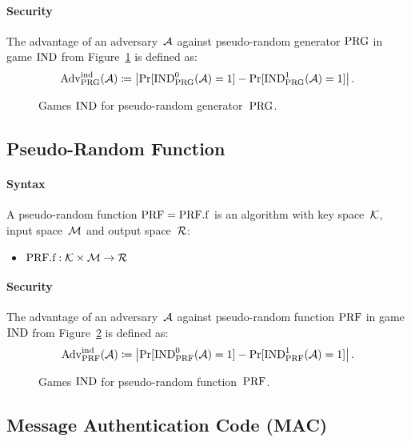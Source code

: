 \documentclass[a4paper,orivec]{llncs}
\begin{document}
\paragraph{Security}
The advantage of an adversary~$\mathcal{A}$ against pseudo-random generator $\mathrm{PRG}$ in game ${\mathrm{IND}}$ from Figure~\ref{fig:prg:ind} is defined as:
\[
\mathrm{Adv}_{\mathrm{PRG}}^{\mathrm{ind}}(\mathcal{A})\coloneqq\left|\Pr[{\mathrm{IND}}_{\mathrm{PRG}}^0(\mathcal{A})=1]-\Pr[{\mathrm{IND}}_{\mathrm{PRG}}^1(\mathcal{A})=1]\right|\text{.}
\]

\begin{figure}[!ht]
    \centering
    \nicoresetlinenr%
    \fbox{%
        \scalebox{\codescalefactor}{%
        }%
    }
    \caption{%
        Games ${\mathrm{IND}}$ for pseudo-random generator~$\mathrm{PRG}$.
    }
    \label{fig:prg:ind}
\end{figure}

\subsection{Pseudo-Random Function}

\paragraph{Syntax}
A pseudo-random function $\mathrm{PRF}=\mathrm{PRF}.\mathrm{f}$ is an algorithm with key space~$\mathcal{K}$, input space~$\mathcal{M}$ and output space~$\mathcal{R}$:

\begin{itemize}
    \item $\mathrm{PRF}.\mathrm{f}: \mathcal{K}\times\mathcal{M} \to \mathcal{R}$
\end{itemize}

\paragraph{Security}
The advantage of an adversary~$\mathcal{A}$ against pseudo-random function $\mathrm{PRF}$ in game ${\mathrm{IND}}$ from Figure~\ref{fig:prf:ind} is defined as:
\[
\mathrm{Adv}_{\mathrm{PRF}}^{\mathrm{ind}}(\mathcal{A})\coloneqq\left|\Pr[{\mathrm{IND}}_{\mathrm{PRF}}^0(\mathcal{A})=1]-\Pr[{\mathrm{IND}}_{\mathrm{PRF}}^1(\mathcal{A})=1]\right|\text{.}
\]

\begin{figure}[!ht]
    \centering
    \nicoresetlinenr%
    \fbox{%
        \scalebox{\codescalefactor}{%
        }%
    }
    \caption{%
        Games ${\mathrm{IND}}$ for pseudo-random function~$\mathrm{PRF}$.
    }
    \label{fig:prf:ind}
\end{figure}

\subsection{Message Authentication Code (MAC)}
\end{document}
